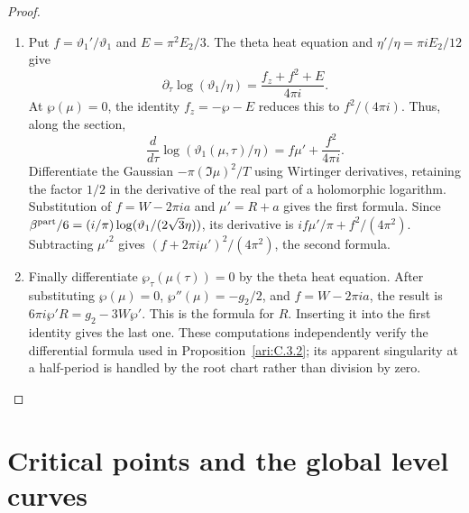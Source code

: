 \begin{proof}
\begin{enumerate}[label=\arabic*.,leftmargin=*]
\item Put $f=\vartheta_1'/\vartheta_1$ and
$E=\pi^2E_2/3$. The theta heat equation and
$\eta'/\eta=\pi iE_2/12$ give
\[
 \partial_\tau\log(\vartheta_1/\eta)
       =\frac{f_z+f^2+E}{4\pi i}.
\]
At $\wp(\mu)=0$, the identity $f_z=-\wp-E$ reduces
this to $f^2/(4\pi i)$. Thus, along the section,
\[
 \frac{d}{d\tau}\log(\vartheta_1(\mu,\tau)/\eta)
       =f\mu'+\frac{f^2}{4\pi i}.
\]
Differentiate the Gaussian $-\pi(\Im\mu)^2/T$ using
Wirtinger derivatives, retaining the factor $1/2$ in
the derivative of the real part of a holomorphic logarithm.
Substitution of $f=W-2\pi ia$ and $\mu'=R+a$ gives the
first formula. Since
$\beta^{\rm part}/6=(i/\pi)\log(\vartheta_1/(2\sqrt3\eta))$,
its derivative is $if\mu'/\pi+f^2/(4\pi^2)$.
Subtracting $\mu'^2$ gives
$(f+2\pi i\mu')^2/(4\pi^2)$, the second formula.

\item Finally differentiate $\wp_\tau(\mu(\tau))=0$ by the theta
heat equation. After substituting $\wp(\mu)=0$,
$\wp''(\mu)=-g_2/2$, and $f=W-2\pi ia$, the result is
$6\pi i\wp'R=g_2-3W\wp'$. This is the formula for $R$.
Inserting it into the first identity gives the last one.
These computations independently verify the differential formula used in Proposition~\ref{ari:C.3.2};
its apparent singularity at a half-period is
handled by the root chart rather than division by zero.
\end{enumerate}
\end{proof}



\section{Critical points and the global level curves}


